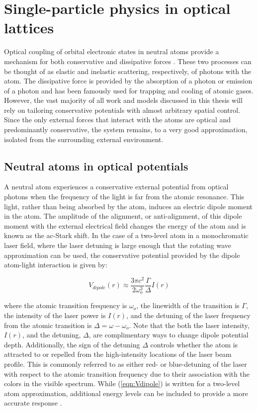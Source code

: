 \section{Single-particle physics in optical lattices}

Optical coupling of orbital electronic states in neutral atoms provide a mechanism for both conservative and dissipative forces \cite{Metcalf1999}. These two processes can be thought of as elastic and inelastic scattering, respectively, of photons with the atom. The dissipative force is provided by the absorption of a photon or emission of a photon and has been famously used for trapping and cooling of atomic gases\cite{Chu1986,Raab1987,Chu1998,Metcalf1999}. However, the vast majority of all work and models discussed in this thesis will rely on tailoring conservative potentials with almost arbitrary spatial control\cite{Ashkin1970,Metcalf1999,Grimm2000}. Since the only external forces that interact with the atoms are optical and predominantly conservative, the system remains, to a very good approximation, isolated from the surrounding external environment.

\subsection{Neutral atoms in optical potentials}

A neutral atom experiences a conservative external potential from optical photons when the frequency of the light is far from the atomic resonance. This light, rather than being absorbed by the atom, induces an electric dipole moment in the atom. The amplitude of the alignment, or anti-alignment, of this dipole moment with the external electrical field changes the energy of the atom and is known as the ac-Stark shift\cite{Ashkin1970}. In the case of a two-level atom in a monochromatic laser field, where the laser detuning is large enough that the rotating wave approximation can be used, the conservative potential provided by the dipole atom-light interaction is given by: 

\begin{equation}
\label{eqn:Vdipole}
	V_{dipole} (r) \approx \frac{3\pi c^2}{2 \omega_o^3}\frac{\Gamma}{\Delta} I(r)
\end{equation}


where the atomic transition frequency is $\omega_o$, the linewidth of the transition is $\Gamma$, the intensity of the laser power is $I(r)$, and the detuning of the laser frequency from the atomic transition is $\Delta = \omega-\omega_o$. Note that the both the laser intensity, $I(r)$, and the detuning, $\Delta$, are complimentary ways to change dipole potential depth. Additionally, the sign of the detuning $\Delta$ controls whether the atom is attracted to or repelled from the high-intensity locations of the laser beam profile. This is commonly referred to as either red- or blue-detuning of the laser with respect to the atomic transition frequency due to their association with the colors in the visible spectrum. While (\ref{eqn:Vdipole}) is written for a two-level atom approximation, additional energy levels can be included to provide a more accurate response \cite{Metcalf1999}.

